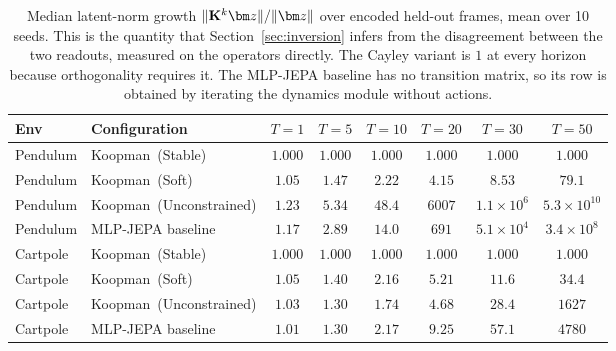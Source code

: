 \begin{table}[t]
\caption{Median latent-norm growth $\|\K^k\z\| / \|\z\|$ over encoded held-out frames, mean over 10 seeds. This is the quantity that Section~\ref{sec:inversion} infers from the disagreement between the two readouts, measured on the operators directly. The Cayley variant is $1$ at every horizon because orthogonality requires it. The MLP-JEPA baseline has no transition matrix, so its row is obtained by iterating the dynamics module without actions.}
\label{tab:drift}
\centering
\small
\begin{tabular}{@{}llcccccc@{}}
\toprule
\textbf{Env} & \textbf{Configuration} & $T{=}1$ & $T{=}5$ & $T{=}10$ & $T{=}20$ & $T{=}30$ & $T{=}50$ \\
\midrule
Pendulum & Koopman~(Stable) & $1.000$ & $1.000$ & $1.000$ & $1.000$ & $1.000$ & $1.000$ \\
Pendulum & Koopman~(Soft) & $1.05$ & $1.47$ & $2.22$ & $4.15$ & $8.53$ & $79.1$ \\
Pendulum & Koopman~(Unconstrained) & $1.23$ & $5.34$ & $48.4$ & $6007$ & $1.1{\times}10^{6}$ & $5.3{\times}10^{10}$ \\
Pendulum & MLP-JEPA baseline & $1.17$ & $2.89$ & $14.0$ & $691$ & $5.1{\times}10^{4}$ & $3.4{\times}10^{8}$ \\
\midrule
Cartpole & Koopman~(Stable) & $1.000$ & $1.000$ & $1.000$ & $1.000$ & $1.000$ & $1.000$ \\
Cartpole & Koopman~(Soft) & $1.05$ & $1.40$ & $2.16$ & $5.21$ & $11.6$ & $34.4$ \\
Cartpole & Koopman~(Unconstrained) & $1.03$ & $1.30$ & $1.74$ & $4.68$ & $28.4$ & $1627$ \\
Cartpole & MLP-JEPA baseline & $1.01$ & $1.30$ & $2.17$ & $9.25$ & $57.1$ & $4780$ \\
\bottomrule
\end{tabular}
\end{table}
